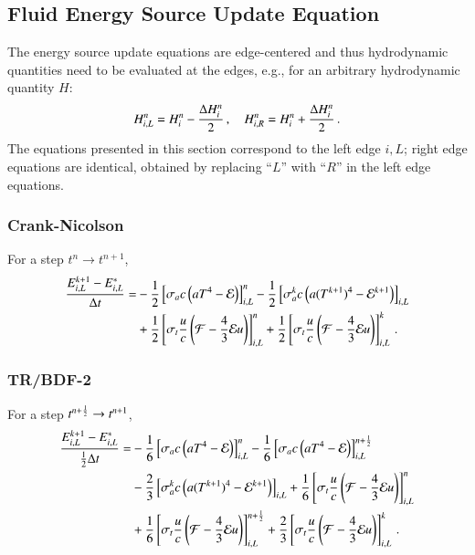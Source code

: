 \subsection{Fluid Energy Source Update Equation}
The energy source update equations are edge-centered and thus hydrodynamic
quantities need to be evaluated at the edges, e.g., for an arbitrary
hydrodynamic quantity $H$:
\begin{equation}
  H_{i,L}^n = H_i^n - \frac{\Delta H_i^n}{2} \, ,\quad
  H_{i,R}^n = H_i^n + \frac{\Delta H_i^n}{2} \, .
\end{equation}
The equations presented in this section correspond to the left edge $i,L$;
right edge equations are identical, obtained by replacing ``$L$'' with
``$R$'' in the left edge equations.

\subsubsection{Crank-Nicolson}
For a step $t^n\rightarrow t^{n+1}$,
\begin{equation}\begin{split}
  \frac{E\iL^{k+1}-E\iL^*}{\dt} = &
  -\half\left[\sigma_{a} c\left(aT^4 - \E\right)\right]\iL^n
  -\half\left[\sigma_{a}^k c\left(a(T^{k+1})^4 - \E^{k+1}\right)\right]\iL\\
  &+\half\left[\sigma_{t}\frac{u}{c}\left(\F-\frac{4}{3}\E u\right)\right]\iL^n
   +\half\left[\sigma_{t}\frac{u}{c}\left(\F-\frac{4}{3}\E u\right)\right]\iL^k
  \pep
\lequ{hydroECNfull}
\end{split}\end{equation}

\subsubsection{TR/BDF-2}
For a step $t^{n+\frac{1}{2}}\rightarrow t^{n+1}$,
\begin{equation}\begin{split}
  \frac{E\iL^{k+1}-E\iL^*}{\half\dt} = &
  -\sixth\left[\sigma_a c\left(aT^4 - \E\right)\right]\iL^n
  -\sixth\left[\sigma_a c\left(aT^4 - \E\right)\right]\iL^{n+\half}\\
  &-\frac{2}{3}\left[\sigma_a^k c\left(a(T^{k+1})^4 - \E^{k+1}\right)\right]\iL
   +\sixth\left[\sigma_t\frac{u}{c}\left(\F-\frac{4}{3}\E u\right)\right]\iL^n\\
  &+\sixth\left[\sigma_t\frac{u}{c}\left(\F-\frac{4}{3}\E u\right)\right]\iL^{n+\half}
   +\frac{2}{3}\left[\sigma_t\frac{u}{c}\left(\F-\frac{4}{3}\E u\right)\right]\iL^k
  \pep
\lequ{hydroEBDF2full}
\end{split}\end{equation}

